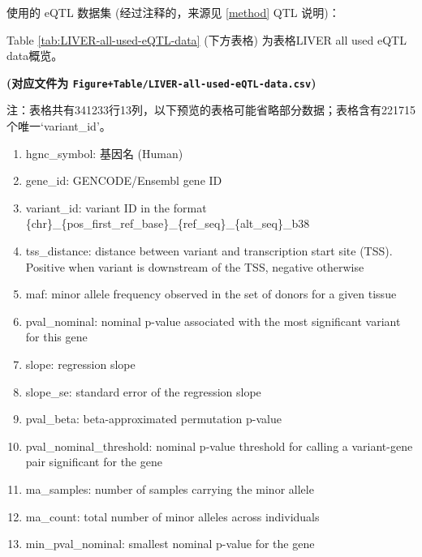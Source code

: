 \documentclass[
]{article}
\providecommand{\tightlist}{%
  \setlength{\itemsep}{0pt}\setlength{\parskip}{0pt}}
\begin{document}
使用的 eQTL 数据集 (经过注释的，来源见 \ref{method} QTL 说明)：

Table \ref{tab:LIVER-all-used-eQTL-data} (下方表格) 为表格LIVER all used eQTL data概览。

\textbf{(对应文件为 \texttt{Figure+Table/LIVER-all-used-eQTL-data.csv})}

\begin{center}\begin{tcolorbox}[colback=gray!10, colframe=gray!50, width=0.9\linewidth, arc=1mm, boxrule=0.5pt]注：表格共有341233行13列，以下预览的表格可能省略部分数据；表格含有221715个唯一`variant\_id'。
\end{tcolorbox}
\end{center}
\begin{center}\begin{tcolorbox}[colback=gray!10, colframe=gray!50, width=0.9\linewidth, arc=1mm, boxrule=0.5pt]\begin{enumerate}\tightlist
\item hgnc\_symbol:  基因名 (Human)
\item gene\_id:  GENCODE/Ensembl gene ID
\item variant\_id:  variant ID in the format \{chr\}\_\{pos\_first\_ref\_base\}\_\{ref\_seq\}\_\{alt\_seq\}\_b38
\item tss\_distance:  distance between variant and transcription start site (TSS). Positive when variant is downstream of the TSS, negative otherwise
\item maf:  minor allele frequency observed in the set of donors for a given tissue
\item pval\_nominal:  nominal p-value associated with the most significant variant for this gene
\item slope:  regression slope
\item slope\_se:  standard error of the regression slope
\item pval\_beta:  beta-approximated permutation p-value
\item pval\_nominal\_threshold:  nominal p-value threshold for calling a variant-gene pair significant for the gene
\item ma\_samples:  number of samples carrying the minor allele
\item ma\_count:  total number of minor alleles across individuals
\item min\_pval\_nominal:  smallest nominal p-value for the gene
\end{enumerate}\end{tcolorbox}
\end{center}
\end{document}
